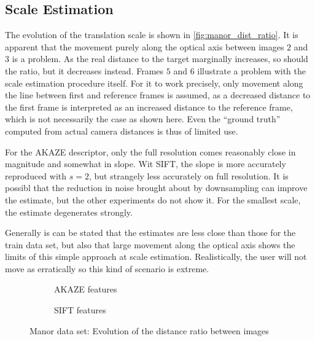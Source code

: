 \subsection{Scale Estimation}

The evolution of the translation scale is shown in \autoref{fig:manor_dist_ratio}.
It is apparent that the movement purely along the optical axis between images
$2$ and $3$ is a problem. As the real distance to the target marginally
increases, so should the ratio, but it decreases instead. Frames $5$ and $6$
illustrate a problem with the scale estimation procedure itself. For it to work
precisely, only movement along the line between first and reference frames is
assumed, as a decreased distance to the first frame is interpreted as an
increased distance to the reference frame, which is not necessarily the case as
shown here. Even the ``ground truth'' computed from actual camera distances is thus
of limited use.

For the AKAZE descriptor, only the full resolution comes reasonably close in
magnitude and somewhat in slope. Wit SIFT, the slope is more accurately
reproduced with $s=2$, but strangely less accurately on full resolution. It is
possibl that the reduction in noise brought about by downsampling can improve
the estimate, but the other experiments do not show it. For the
smallest scale, the estimate degenerates strongly.

Generally is can be stated that the estimates are less close than those for the
train data set, but also that large movement along the optical axis shows the
limits of this simple approach at scale estimation. Realistically, the user will
not move as erratically so this kind of scenario is extreme.

\begin{figure}
   \begin{subfigure}[b]{.5\linewidth}
      \centering      
      
      \caption{AKAZE features}
      \label{fig:manor_KAZE_dist_ratio}
   \end{subfigure}
   \quad\begin{subfigure}[b]{.5\linewidth}
      \centering      
      
      \caption{SIFT features}
      \label{fig:manor_SIFT_dist_ratio}
   \end{subfigure}
   \caption[Manor Data: distance ratio]{Manor data set: Evolution of the distance ratio between images}
   \label{fig:manor_dist_ratio}
\end{figure}

